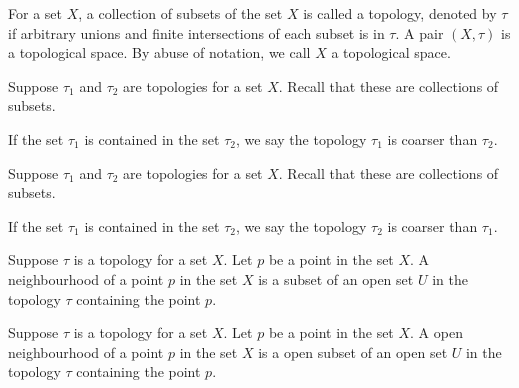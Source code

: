 \begin{definition}
	\label{definition-topological-space}
	For a set $X$, a collection of subsets 
	of the set $X$ is called a topology, denoted by $\tau$ 
	if arbitrary unions and finite intersections of each subset
	is in $\tau$. A pair $(X, \tau)$ is a topological space.
	By abuse of notation, we call $X$ a topological space.
\end{definition}

\begin{definition}[Coarser]
	\label{definition-coarser}
	Suppose $\tau_1$ and $\tau_2$ are topologies for a set $X$.
	Recall that these are collections of subsets.
	
	If the set $\tau_1$ is contained in the set $\tau_2$, we say the topology 
	$\tau_1$ is coarser than $\tau_2$.
\end{definition}

\begin{definition}[Finer]
	\label{definition-finer}
	Suppose $\tau_1$ and $\tau_2$ are topologies for a set $X$.
	Recall that these are collections of subsets.
	
	If the set $\tau_1$ is contained in the set $\tau_2$, we say the topology 
	$\tau_2$ is coarser than $\tau_1$.
\end{definition}

\begin{definition}[Neighbourhood]
	\label{definition-neighbourhood}
	Suppose $\tau$ is a topology for a set $X$.
	Let $p$ be a point in the set $X$.
	A neighbourhood of a point $p$ in the set $X$ is a subset of an open set $U$ in the topology $\tau$ containing the point $p$.
\end{definition}

\begin{definition}
	\label{definition-open-neighbourhood}
	Suppose $\tau$ is a topology for a set $X$.
	Let $p$ be a point in the set $X$.
	A open neighbourhood of a point $p$ in the set $X$ is a open subset of an open set $U$ in the topology $\tau$ containing the point $p$.
\end{definition}